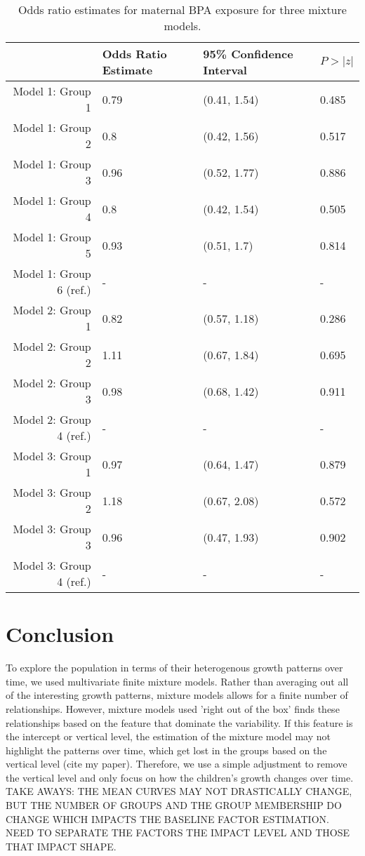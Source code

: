 \begin{table}[ht]
\begin{center}
\begin{tabular}{rlll}
  \hline
 & Odds Ratio Estimate & 95\% Confidence Interval & $P>|z|$ \\ 
  \hline
Model 1: Group  1 & 0.79 & (0.41, 1.54) & 0.485 \\ 
  Model 1: Group  2 & 0.8 & (0.42, 1.56) & 0.517 \\ 
  Model 1: Group  3 & 0.96 & (0.52, 1.77) & 0.886 \\ 
  Model 1: Group  4 & 0.8 & (0.42, 1.54) & 0.505 \\ 
  Model 1: Group  5 & 0.93 & (0.51, 1.7) & 0.814 \\ 
  Model 1: Group  6  (ref.) & - & - & - \\ 
  Model 2: Group  1 & 0.82 & (0.57, 1.18) & 0.286 \\ 
  Model 2: Group  2 & 1.11 & (0.67, 1.84) & 0.695 \\ 
  Model 2: Group  3 & 0.98 & (0.68, 1.42) & 0.911 \\ 
  Model 2: Group  4  (ref.) & - & - & - \\ 
  Model 3: Group  1 & 0.97 & (0.64, 1.47) & 0.879 \\ 
  Model 3: Group  2 & 1.18 & (0.67, 2.08) & 0.572 \\ 
  Model 3: Group  3 & 0.96 & (0.47, 1.93) & 0.902 \\ 
  Model 3: Group  4  (ref.) & - & - & - \\ 
   \hline
\end{tabular}
\caption{Odds ratio estimates for maternal BPA exposure for three mixture models. }
\end{center}
\end{table}

\section{Conclusion}
To explore the population in terms of their heterogenous growth patterns over time, we used multivariate finite mixture models. Rather than averaging out all of the interesting growth patterns, mixture models allows for a finite number of relationships. However, mixture models used 'right out of the box' finds these relationships based on the feature that dominate the variability. If this feature is the intercept or vertical level, the estimation of the mixture model may not highlight the patterns over time, which get lost in the groups based on the vertical level (cite my paper). Therefore, we use a simple adjustment to remove the vertical level and only focus on how the children's growth changes over time.\\

TAKE AWAYS: THE MEAN CURVES MAY NOT DRASTICALLY CHANGE, BUT THE NUMBER OF GROUPS AND THE GROUP MEMBERSHIP DO CHANGE WHICH IMPACTS THE BASELINE FACTOR ESTIMATION. NEED TO SEPARATE THE FACTORS THE IMPACT LEVEL AND THOSE THAT IMPACT SHAPE. 

